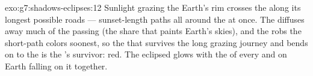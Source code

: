 \begin{solution}{exo:g7:shadows-eclipses:12}
Sunlight grazing the Earth's rim crosses the  along its
longest possible roads --- sunset-length paths all around the
 at once. The  diffuses away much of the passing 
(the share that paints Earth's skies), and the  robs the
short-path colors soonest, so the  that survives the long
grazing journey and bends on to the  is the 's
survivor: red. The eclipsed  glows with the  of every
 and  on Earth falling on it together.
\end{solution}

